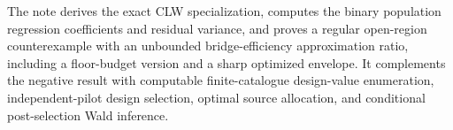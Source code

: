 The note derives the exact CLW specialization, computes the binary population regression coefficients and residual variance, and proves a regular open-region counterexample with an unbounded bridge-efficiency approximation ratio, including a floor-budget version and a sharp optimized envelope. It complements the negative result with computable finite-catalogue design-value enumeration, independent-pilot design selection, optimal source allocation, and conditional post-selection Wald inference.
